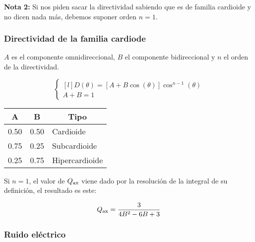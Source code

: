 \documentclass[a4paper, 8pt]{extarticle}
\begin{document}
\begin{multicols}{3}
  \textbf{Nota 2:} Si nos piden sacar la directividad sabiendo que es de familia cardioide y no dicen nada más, debemos suponer orden $n=1$.
  \subsubsection{Directividad de la familia cardiode}
  $A$ es el componente omnidireccional, $B$ el componente bidireccional y $n$ el orden de la directividad.

  \[\left\lbrace
    \begin{matrix*}[l]
      D (\theta ) = \left[ A + B \cos (\theta ) \right] \cos ^{n-1} (\theta )  \\
      A + B = 1
    \end{matrix*}\right.\]


  \begin{center}
    \begin{tabular}{|c|c|l|}
      \hline
      \rowcolor[rgb]{ .663,  .816,  .557} A    & B    & \multicolumn{1}{c|}{Tipo} \\
      \hline
      \rowcolor[rgb]{ .886,  .937,  .855} 0.50 & 0.50 & Cardioide                 \\
      \hline
      \rowcolor[rgb]{ .886,  .937,  .855} 0.75 & 0.25 & Subcardioide              \\
      \hline
      \rowcolor[rgb]{ .886,  .937,  .855} 0.25 & 0.75 & Hipercardioide            \\
      \hline
    \end{tabular}
  \end{center}

  Si $n = 1$, el valor de $Q _{\textnormal{ax}}$ viene dado por la resolución de la integral de su definición, el resultado es este:

  \[ Q _{\textnormal{ax}} = \frac{3}{4B^2 - 6B + 3} \]


  \subsubsection{Ruido eléctrico}


\end{multicols}
\end{document}
